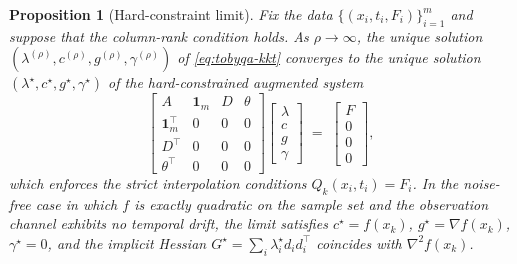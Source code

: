 \documentclass[11pt,a4paper]{article}
\newtheorem{proposition}[theorem]{Proposition}
\begin{document}
\begin{proposition}[Hard-constraint limit]\label{prop:hard-limit}
Fix the data $\{(x_i, t_i, F_i)\}_{i=1}^m$ and suppose that the
column-rank condition holds. As $\rho \to \infty$, the unique
solution $(\lambda^{(\rho)}, c^{(\rho)}, g^{(\rho)},
\gamma^{(\rho)})$ of \eqref{eq:tobyqa-kkt} converges to the unique
solution $(\lambda^\star, c^\star, g^\star, \gamma^\star)$ of the
hard-constrained augmented system
\begin{equation}\label{eq:hard-kkt}
  \begin{bmatrix}
    A & \mathbf{1}_m & D & \theta \\
    \mathbf{1}_m^\top & 0 & 0 & 0 \\
    D^\top & 0 & 0 & 0 \\
    \theta^\top & 0 & 0 & 0
  \end{bmatrix}
  \begin{bmatrix} \lambda \\ c \\ g \\ \gamma \end{bmatrix}
  \;=\;
  \begin{bmatrix} F \\ 0 \\ 0 \\ 0 \end{bmatrix},
\end{equation}
which enforces the strict interpolation conditions
$Q_k(x_i, t_i) = F_i$. In the noise-free case in which $f$ is exactly
quadratic on the sample set and the observation channel exhibits no
temporal drift, the limit satisfies $c^\star = f(x_k)$,
$g^\star = \nabla f(x_k)$, $\gamma^\star = 0$, and the implicit
Hessian $G^\star = \sum_i \lambda^\star_i d_i d_i^\top$ coincides
with $\nabla^2 f(x_k)$.
\end{proposition}
\end{document}
